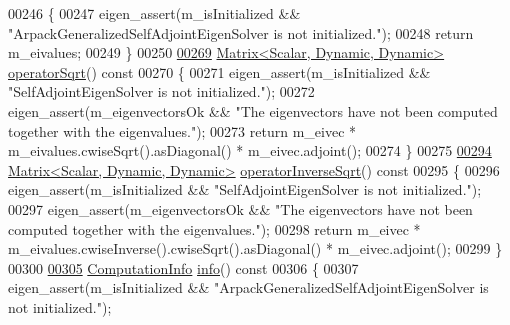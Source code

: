 \begin{DoxyCode}
00246 \textcolor{keyword}{  }\{
00247     eigen\_assert(m\_isInitialized && \textcolor{stringliteral}{"ArpackGeneralizedSelfAdjointEigenSolver is not initialized."});
00248     \textcolor{keywordflow}{return} m\_eivalues;
00249   \}
00250 
\hyperlink{class_eigen_1_1_arpack_generalized_self_adjoint_eigen_solver_a7522aad061ebccc065b254c0bc67d3b0}{00269}   \hyperlink{group___core___module}{Matrix<Scalar, Dynamic, Dynamic>} \hyperlink{class_eigen_1_1_arpack_generalized_self_adjoint_eigen_solver_a7522aad061ebccc065b254c0bc67d3b0}{operatorSqrt}()\textcolor{keyword}{ const}
00270 \textcolor{keyword}{  }\{
00271     eigen\_assert(m\_isInitialized && \textcolor{stringliteral}{"SelfAdjointEigenSolver is not initialized."});
00272     eigen\_assert(m\_eigenvectorsOk && \textcolor{stringliteral}{"The eigenvectors have not been computed together with the
       eigenvalues."});
00273     \textcolor{keywordflow}{return} m\_eivec * m\_eivalues.cwiseSqrt().asDiagonal() * m\_eivec.adjoint();
00274   \}
00275 
\hyperlink{class_eigen_1_1_arpack_generalized_self_adjoint_eigen_solver_ad55f052b675f1deaea220d0cc225622a}{00294}   \hyperlink{group___core___module}{Matrix<Scalar, Dynamic, Dynamic>} 
      \hyperlink{class_eigen_1_1_arpack_generalized_self_adjoint_eigen_solver_ad55f052b675f1deaea220d0cc225622a}{operatorInverseSqrt}()\textcolor{keyword}{ const}
00295 \textcolor{keyword}{  }\{
00296     eigen\_assert(m\_isInitialized && \textcolor{stringliteral}{"SelfAdjointEigenSolver is not initialized."});
00297     eigen\_assert(m\_eigenvectorsOk && \textcolor{stringliteral}{"The eigenvectors have not been computed together with the
       eigenvalues."});
00298     \textcolor{keywordflow}{return} m\_eivec * m\_eivalues.cwiseInverse().cwiseSqrt().asDiagonal() * m\_eivec.adjoint();
00299   \}
00300 
\hyperlink{class_eigen_1_1_arpack_generalized_self_adjoint_eigen_solver_a6f952eed50efe01b8cb91726e6a93b68}{00305}   \hyperlink{group__enums_ga85fad7b87587764e5cf6b513a9e0ee5e}{ComputationInfo} \hyperlink{class_eigen_1_1_arpack_generalized_self_adjoint_eigen_solver_a6f952eed50efe01b8cb91726e6a93b68}{info}()\textcolor{keyword}{ const}
00306 \textcolor{keyword}{  }\{
00307     eigen\_assert(m\_isInitialized && \textcolor{stringliteral}{"ArpackGeneralizedSelfAdjointEigenSolver is not initialized."});

\end{DoxyCode}
